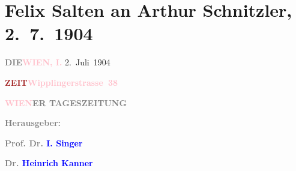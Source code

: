 

\renewcommand{\erwaehntePersonen}{Personen: Gabriele D’Annunzio, Heinrich Kanner, Isidor Singer, Karl Gustav Vollmoeller}
\renewcommand{\erwaehnteInstitutionen}{Institutionen: Die Zeit}
\renewcommand{\erwaehnteOrte}{Orte: Edmund-Weiß-Gasse, I., Innere Stadt, Wien, Wipplingerstraße}
\renewcommand{\erwaehnteWerke}{Werke: Die Zeit, Giulia. Drama in einem Akt}
\section[Felix Salten an Arthur Schnitzler, 2. 7. 1904]{Felix Salten an Arthur Schnitzler, 2. 7. 1904}
\nopagebreak{}
\rehead{ }\normalsize\beginnumbering{}
\toendnotes[C]{\smallbreak\pagebreak[2]}
\toendnotes[C]{\smallbreak}
\pstart
           \noindent{}{\pb}\textcolor{gray}{\textbf{DIE}}\hfill \textcolor{gray}{\textbf{\textcolor{pink}{WIEN, I.}{}\ledrightnote{\textcolor{pink}{I., Innere Stadt}}}}{ }2. Juli 1904\pend
           
\pstart
           \textcolor{gray}{\textbf{\textcolor{brown}{ZEIT}{}\ledrightnote{\textcolor{brown}{Die Zeit}}}}\hfill \textcolor{gray}{\textbf{\textcolor{pink}{Wipplingerstrasse 38}{}\ledrightnote{\textcolor{pink}{Wipplingerstraße}}}}\pend
           
\pstart
           \textcolor{gray}{\textbf{\textcolor{pink}{WIEN}{}\ledrightnote{\textcolor{pink}{Wien}}ER
                     TAGESZEITUNG}}\pend
           
\pstart
           \textcolor{gray}{\textbf{Herausgeber: }}\pend
           
\pstart
           \textcolor{gray}{\textbf{Prof. Dr. \textcolor{blue}{I. Singer}{}\ledrightnote{\textcolor{blue}{Isidor Singer}}}}\pend
           
\pstart
           \textcolor{gray}{\textbf{Dr. \textcolor{blue}{Heinrich Kanner}{}\ledrightnote{\textcolor{blue}{Heinrich Kanner}}}}\pend
           
